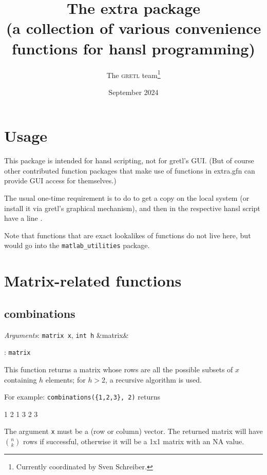 \documentclass[11pt,english]{article}
\newcommand{\noun}[1]{\textsc{#1}}
\newcommand{\ArgRet}[2]{%
  {\it Arguments}: {#1}%
  \ifx&#2&%
  \else
  \par\smallskip\noindent {\it Return type}: \texttt{#2}
  \fi%
  \par\medskip\par%
  }
\begin{document}
\title{The extra package\\
(a collection of various convenience functions for hansl programming) }

\date{September 2024}

\author{The \noun{gretl} team\thanks{Currently coordinated by Sven
Schreiber.}}

\maketitle
\tableofcontents{}

\section{Usage}

This package is intended for hansl scripting, not for gretl's GUI.
(But of course other contributed function packages that make use of
functions in extra.gfn can provide GUI access for themselves.)

The usual one-time requirement is to do 
to get a copy on the local system (or install it via gretl's graphical
mechanism), and then in the respective hansl script have a line .

Note that functions that are exact lookalikes of 
functions do not live here, but would go into the
\texttt{matlab\_utilities} package.


\section{Matrix-related functions}

\subsection{combinations}

\ArgRet{\texttt{matrix x}, \texttt{int h}}{matrix} This function
returns a matrix whose rows are all the possible subsets of $x$
containing $h$ elements; for $h>2$, a recursive algorithm is used.

For example: \texttt{combinations(\{1,2,3\}, 2)} returns
\begin{code}
         1   2
         1   3
         2   3
\end{code}

The argument \texttt{x} must be a (row or column) vector. The returned
matrix will have $n \choose k$ rows if successful, otherwise it will be a 1x1
matrix with an NA value.
\end{document}
